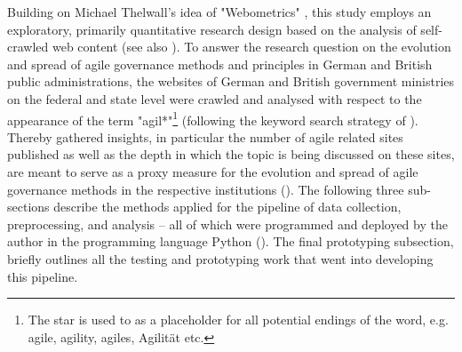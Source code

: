 Building on Michael Thelwall's idea of "Webometrics" \parencite{Thelwall2009}, this study employs an exploratory, primarily quantitative research design based on the analysis of self-crawled web content (see also \cite{Olston2010, Jaeger1998, Ignatow2018}). To answer the research question on the evolution and spread of agile governance methods and principles in German and British public administrations, the websites of German and British government ministries on the federal and state level were crawled and analysed with respect to the appearance of the term "agil*"\footnote{The star is used to as a placeholder for all potential endings of the word, e.g. agile, agility, agiles, Agilität etc.} (following the keyword search strategy of \cite{Mergel2018}). Thereby gathered insights, in particular the number of agile related sites published as well as the depth in which the topic is being discussed on these sites, are meant to serve as a proxy measure for the evolution and spread of agile governance methods in the respective institutions (\cite{Branco2006, Ghosh2013}). The following three sub-sections describe the methods applied for the pipeline of data collection, preprocessing, and analysis – all of which were programmed and deployed by the author in the programming language Python (\cite{VanRossum1995}). The final prototyping subsection, briefly outlines all the testing and prototyping work that went into developing this pipeline.

